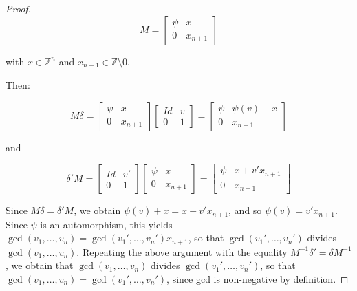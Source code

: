 \documentclass{amsart}
\newcommand{\Z}{\mathbb{Z}}
\theoremstyle{plain}
\theoremstyle{definition}
\theoremstyle{remark}
\begin{document}
\begin{proof}
    $$M = \begin{bmatrix}
        \psi & x \\
        0 & x_{n+1}
    \end{bmatrix}$$

    with $x \in \Z^n$ and $x_{n+1} \in \Z \setminus 0$.

    Then: 

    $$M \delta = \begin{bmatrix}
        \psi & x \\
        0 & x_{n+1}
    \end{bmatrix} \begin{bmatrix}
        Id & v \\
        0 & 1
    \end{bmatrix} = \begin{bmatrix}
        \psi & \psi(v) + x \\
        0 & x_{n+1}
    \end{bmatrix}$$

    and

    $$\delta' M = \begin{bmatrix}
        Id & v' \\
        0 & 1
    \end{bmatrix} \begin{bmatrix}
        \psi & x \\
        0 & x_{n+1}
    \end{bmatrix} = \begin{bmatrix}
        \psi & x + v'x_{n+1} \\
        0 & x_{n+1}
    \end{bmatrix}$$

    Since $M \delta = \delta' M$, we obtain $\psi(v) + x = x + v'x_{n+1}$, and so $\psi(v) = v' x_{n+1}$. Since $\psi$ is an automorphism, this yields $\gcd(v_1,\ldots,v_n) = \gcd(v_1',\ldots,v_n') x_{n+1}$, so that $\gcd(v_1',\ldots,v_n')$ divides $\gcd(v_1,\ldots,v_n)$. Repeating the above argument with the equality $M^{-1} \delta' = \delta M^{-1}$, we obtain that $\gcd(v_1,\ldots,v_n)$ divides $\gcd(v_1',\ldots,v_n')$, so that $\gcd(v_1,\ldots,v_n)=\gcd(v_1',\ldots,v_n')$, since gcd is non-negative by definition. 
\end{proof}
\end{document}
